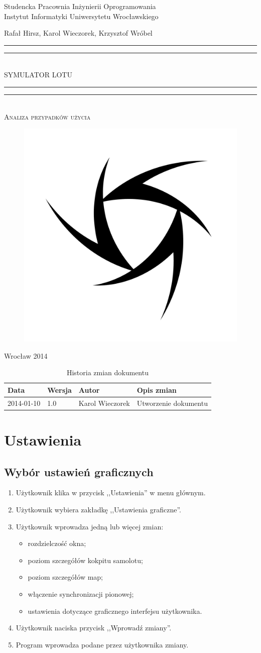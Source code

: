 \documentclass{mwrep}
\newcommand*{\titleGP}{\begingroup
\centering

{\large Studencka Pracownia Inżynierii Oprogramowania}\\Instytut Informatyki Uniwersytetu Wrocławskiego\par
\vspace*{16\baselineskip}

{\Large Rafał Hirsz, Karol Wieczorek, Krzysztof Wróbel\par}
\vspace*{\baselineskip}

\rule{\textwidth}{1.6pt}\vspace*{-\baselineskip}\vspace*{2pt}
\rule{\textwidth}{0.4pt}\\[\baselineskip]

{\Huge SYMULATOR LOTU}\\[0.2\baselineskip]

\rule{\textwidth}{0.4pt}\vspace*{-\baselineskip}\vspace{3.2pt}
\rule{\textwidth}{1.6pt}\\[\baselineskip]

\scshape
{\huge Analiza przypadków użycia}\par
\vspace*{2\baselineskip}

\begin{figure}[h]
\centering
\includegraphics[width=5\baselineskip]{flightsim-team-logo.pdf}
\end{figure}
\vfill

{\large Wrocław 2014}\par

\pagebreak

\endgroup}
\begin{document}
\thispagestyle{empty}
\titleGP

\begin{center}
\begin{table}[h]
\begin{center}
\caption{Historia zmian dokumentu}\label{T:Zmiany}
\vspace{3ex}
\begin{tabularx}{1\textwidth}{|l|l|l|X|}
\hline
Data & Wersja & Autor & Opis zmian \\ \hline
2014-01-10 & 1.0 & Karol Wieczorek & Utworzenie dokumentu \\
\hline
\end{tabularx}
\end{center}
\end{table}
\end{center}

\pagebreak

\tableofcontents

\chapter{Ustawienia}
\section{Wybór ustawień graficznych}
\begin{enumerate}
  \item Użytkownik klika w przycisk ,,Ustawienia'' w menu głównym.
  \item Użytkownik wybiera zakładkę ,,Ustawienia graficzne''.
  \item Użytkownik wprowadza jedną lub więcej zmian:
    \begin{itemize}
      \item rozdzielczość okna;
      \item poziom szczegółów kokpitu samolotu;
      \item poziom szczegółów map;
      \item włączenie synchronizacji pionowej;
      \item ustawienia dotyczące graficznego interfejsu użytkownika.
    \end{itemize}
  \item Użytkownik naciska przycisk ,,Wprowadź zmiany''.
  \item Program wprowadza podane przez użytkownika zmiany.
\end{enumerate}
\end{document}
